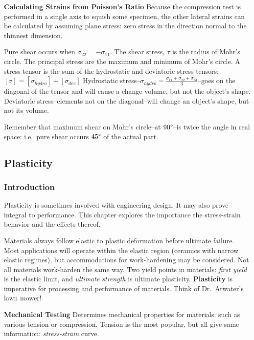 \documentclass[
]{article}
\begin{document}
\textbf{Calculating Strains from Poisson's Ratio} Because the
compression test is performed in a single axis to squish some specimen,
the other lateral strains can be calculated by assuming plane stress:
zero stress in the direction normal to the thinnest dimension.

{}

Pure shear occurs when \(\sigma_{22} = -\sigma_{11}\). The shear stress,
\(\tau\) is the radius of Mohr's circle. The principal stress are the
maximum and minimum of Mohr's circle. A stress tensor is the sum of the
hydrostatic and deviatoric stress tensors:
\([\sigma] = [\sigma_{hydro}] + [\sigma_{dev}]\) Hydrostatic
stress--\(\sigma_{hydro} = \frac{\sigma_{11} + \sigma_{22} + \sigma_{33}}{3}\)--goes
on the diagonal of the tensor and will cause a change volume, but not
the object's shape. Deviatoric stress--elements not on the
diagonal--will change an object's shape, but not its volume.

{Remember that maximum shear on Mohr's circle--at
\(90\text{\textdegree}\)--is twice the angle in real space: i.e.~pure
shear occurs \(45\text{\textdegree}\) of the actual part.}

\hypertarget{plasticity}{%
\subsection{Plasticity}\label{plasticity}}

\hypertarget{introduction-4}{%
\subsubsection{Introduction}\label{introduction-4}}

Plasticity is sometimes involved with engineering design. It may also
prove integral to performance. This chapter explores the importance the
stress-strain behavior and the effects thereof.

Materials always follow elastic to plastic deformation before ultimate
failure. Most applications will operate within the elastic region
(ceramics with narrow elastic regimes), but accommodations for
work-hardening may be considered. Not all materials work-harden the same
way. Two yield points in materials: \textit{first yield} is the elastic
limit, and \textit{ultimate strength} is ultimate plasticity.
\textbf{Plasticity} is imperative for processing and performance of
materials. Think of Dr.~Atwater's lawn mower!

\textbf{Mechanical Testing} Determines mechanical properties for
materials: such as various tension or compression. Tension is the most
popular, but all give same information: \textit{stress-strain} curve.
\end{document}
